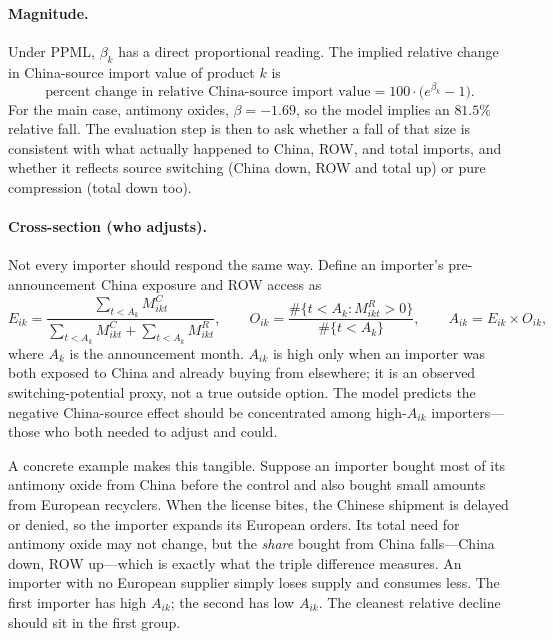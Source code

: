 \documentclass[12pt,a4paper]{article}
\begin{document}
\paragraph{Magnitude.} Under PPML, $\beta_k$ has a direct proportional reading.
The implied relative change in China-source import value of product $k$ is
\begin{equation}
\text{percent change in relative China-source import value} = 100\cdot\bigl(e^{\beta_k}-1\bigr).
\label{eq:magnitude}
\end{equation}
For the main case, antimony oxides, $\beta=-1.69$, so the model implies an
$81.5\%$ relative fall. The evaluation step is then to ask whether a fall of that
size is consistent with what actually happened to China, ROW, and total imports,
and whether it reflects source switching (China down, ROW and total up) or pure
compression (total down too).

\paragraph{Cross-section (who adjusts).} Not every importer should respond the
same way. Define an importer's pre-announcement China exposure and ROW access as
\begin{equation}
E_{ik}=\frac{\sum_{t<A_k} M^{C}_{ikt}}
              {\sum_{t<A_k} M^{C}_{ikt}+\sum_{t<A_k} M^{R}_{ikt}},
\qquad
O_{ik}=\frac{\#\{t<A_k: M^{R}_{ikt}>0\}}{\#\{t<A_k\}},
\qquad
A_{ik}=E_{ik}\times O_{ik},
\label{eq:switching}
\end{equation}
where $A_k$ is the announcement month. $A_{ik}$ is high only when an importer was
both exposed to China and already buying from elsewhere; it is an observed
switching-potential proxy, not a true outside option. The model predicts the
negative China-source effect should be concentrated among high-$A_{ik}$
importers---those who both needed to adjust and could.

A concrete example makes this tangible. Suppose an importer bought most of its
antimony oxide from China before the control and also bought small amounts from
European recyclers. When the license bites, the Chinese shipment is delayed or
denied, so the importer expands its European orders. Its total need for antimony
oxide may not change, but the \emph{share} bought from China falls---China down,
ROW up---which is exactly what the triple difference measures. An importer with
no European supplier simply loses supply and consumes less. The first importer
has high $A_{ik}$; the second has low $A_{ik}$. The cleanest relative decline
should sit in the first group.
\end{document}
